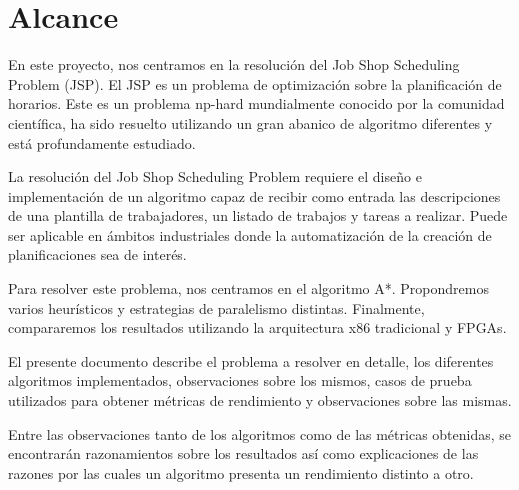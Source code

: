 \pagebreak

\section{Alcance}

En este proyecto, nos centramos en la resolución del Job Shop Scheduling Problem (JSP).
El JSP es un problema de optimización
sobre la planificación de horarios.
Este es un problema np-hard mundialmente conocido
por la comunidad científica,
ha sido resuelto utilizando un gran abanico de algoritmo diferentes
y está profundamente estudiado.

La resolución del Job Shop Scheduling Problem requiere el diseño e implementación de
un algoritmo capaz de recibir como entrada las descripciones de una plantilla
de trabajadores, un listado de trabajos y tareas a realizar. Puede ser
aplicable en ámbitos industriales donde la automatización de la creación
de planificaciones sea de interés.

Para resolver este problema, nos centramos en el algoritmo A*.
Propondremos varios heurísticos y estrategias de paralelismo
distintas.
Finalmente, compararemos los resultados utilizando
la arquitectura x86 tradicional y FPGAs.

El presente documento describe el problema a resolver en detalle,
los diferentes algoritmos implementados,
observaciones sobre los mismos,
casos de prueba utilizados para obtener métricas de rendimiento
y observaciones sobre las mismas.

Entre las observaciones tanto de los algoritmos como de las métricas
obtenidas, se encontrarán razonamientos sobre los resultados así
como explicaciones de las razones por las cuales un algoritmo
presenta un rendimiento distinto a otro.
